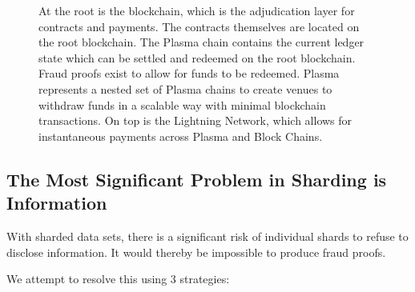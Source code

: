 \documentclass[letterpaper, 11pt]{article}
\begin{document}
\begin{figure}[H]
	\caption{
		At the root is the blockchain, which is the adjudication layer
		for contracts and payments. The contracts themselves are located
		on the root blockchain. The Plasma chain contains the current
		ledger state which can be settled and redeemed on the
		root blockchain. Fraud proofs exist to allow for funds to be
		redeemed. Plasma represents a nested set of Plasma chains to
		create venues to withdraw funds in a scalable way with minimal
		blockchain transactions. On top is the Lightning Network, which
		allows for instantaneous payments across Plasma and Block
		Chains.
	}
\end{figure}

\subsection{The Most Significant Problem in Sharding is Information}

With sharded data sets, there is a significant risk of individual shards to
refuse to disclose information. It would thereby be impossible to produce fraud
proofs.

We attempt to resolve this using 3 strategies:
\end{document}
